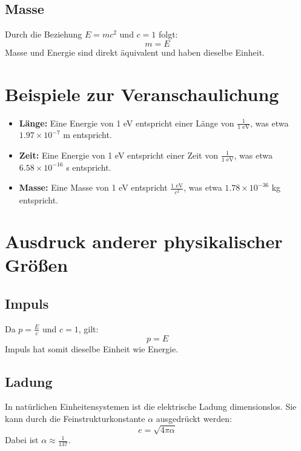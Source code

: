 \documentclass{article}
\begin{document}
	\subsection{Masse}
	Durch die Beziehung $E = mc^2$ und $c=1$ folgt:
	\begin{equation}
		m = E
	\end{equation}
	Masse und Energie sind direkt äquivalent und haben dieselbe Einheit.
	
	\section{Beispiele zur Veranschaulichung}
	
	\begin{itemize}
		\item \textbf{Länge:} Eine Energie von 1 eV entspricht einer Länge von $\frac{1}{1\text{ eV}}$, was etwa $1.97 \times 10^{-7}$ m entspricht.
		\item \textbf{Zeit:} Eine Energie von 1 eV entspricht einer Zeit von $\frac{1}{1\text{ eV}}$, was etwa $6.58 \times 10^{-16}$ s entspricht.
		\item \textbf{Masse:} Eine Masse von 1 eV entspricht $\frac{1\text{ eV}}{c^2}$, was etwa $1.78 \times 10^{-36}$ kg entspricht.
	\end{itemize}
	
	\section{Ausdruck anderer physikalischer Größen}
	
	\subsection{Impuls}
	Da $p = \frac{E}{c}$ und $c=1$, gilt:
	\begin{equation}
		p = E
	\end{equation}
	Impuls hat somit dieselbe Einheit wie Energie.
	
	\subsection{Ladung}
	In natürlichen Einheitensystemen ist die elektrische Ladung dimensionslos. Sie kann durch die Feinstrukturkonstante $\alpha$ ausgedrückt werden:
	\begin{equation}
		e = \sqrt{4\pi\alpha}
	\end{equation}
	Dabei ist $\alpha \approx \frac{1}{137}$.
	
\end{document}
